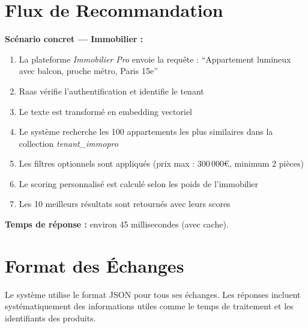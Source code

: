 \documentclass[11pt,a4paper]{report}
\begin{document}
\section{Flux de Recommandation}

\begin{processbox}
\textbf{Scénario concret --- Immobilier :}

\vspace{0.3cm}

\begin{enumerate}
    \item La plateforme \textit{Immobilier Pro} envoie la requête : ``Appartement lumineux avec balcon, proche métro, Paris 15e''
    \item Raas vérifie l'authentification et identifie le tenant
    \item Le texte est transformé en embedding vectoriel
    \item Le système recherche les 100 appartements les plus similaires dans la collection \textit{tenant\_immopro}
    \item Les filtres optionnels sont appliqués (prix max : 300\,000\euro{}, minimum 2 pièces)
    \item Le scoring personnalisé est calculé selon les poids de l'immobilier
    \item Les 10 meilleurs résultats sont retournés avec leurs scores
\end{enumerate}

\vspace{0.3cm}

\textbf{Temps de réponse :} environ 45 millisecondes (avec cache).
\end{processbox}

\section{Format des Échanges}

Le système utilise le format JSON pour tous ses échanges. Les réponses incluent systématiquement des informations utiles comme le temps de traitement et les identifiants des produits.
\end{document}
